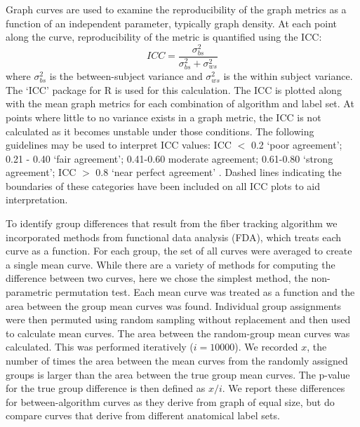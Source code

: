 \documentclass{frontiersSCNS} %
\newcommand{\R}{R}
\begin{document}
Graph curves are used to examine the reproducibility of the graph metrics as a function of an independent parameter, typically graph density. At each point along the curve, reproducibility of the metric is quantified using the ICC:
$$ICC = \frac{\sigma_{bs}^{2}}{\sigma_{bs}^{2} + \sigma_{ws}^{2}} $$
where $\sigma_{bs}^{2}$ is the between-subject variance and $\sigma_{ws}^{2}$ is the within subject variance. The `ICC' package for  \R{} is used for this calculation. The ICC is plotted along with the mean graph metrics for each combination of algorithm and label set. At points where little to no variance exists in a graph metric, the ICC is not calculated as it becomes unstable under those conditions. The following guidelines may be used to interpret ICC values: ICC $<$ 0.2 `poor agreement'; 0.21 - 0.40 `fair agreement'; 0.41-0.60 moderate agreement; 0.61-0.80 `strong agreement'; ICC $>$ 0.8 `near perfect agreement' \citep{Telesford2010,Montgomery2002}. Dashed lines indicating the boundaries of these categories have been included on all ICC plots to aid interpretation.

To identify group differences that result from the fiber tracking algorithm we incorporated methods from functional data analysis (FDA), which treats each curve as a function. For each group, the set of all curves were averaged to create a single mean curve.  While there are a variety of methods for computing the difference between two curves, here we chose the simplest method, the non-parametric permutation test. Each mean curve was treated as a function and the area between the group mean curves was found. Individual group assignments were then permuted using random sampling without replacement and then used to calculate mean curves. The area between the random-group mean curves was calculated. This was performed iteratively ($i=10000$). We recorded $x$, the number of times the area between the mean curves from the randomly assigned groups is larger than the area between the true group mean curves. The p-value for the true group difference is then defined as $x/i$. We report these differences for between-algorithm curves as they derive from graph of equal size, but do compare curves that derive from different anatomical label sets.

\end{document}

